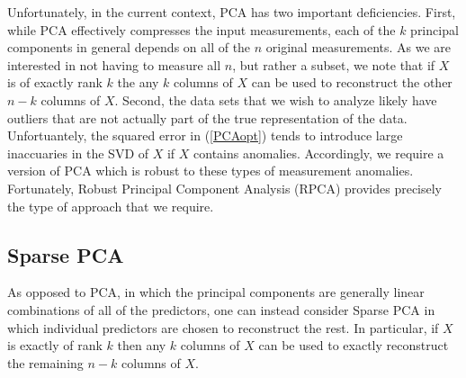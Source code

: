 \documentclass[conference]{IEEEtran}
\begin{document}

Unfortunately, in the current context, PCA has two important deficiencies.  First, while PCA effectively compresses the input measurements, each of the $k$ principal components in general depends on all of the $n$ original measurements.   As we are interested in not having to measure all $n$, but rather a subset, we note that if $X$ is of exactly rank $k$ the any $k$ columns of $X$ can be used to reconstruct the other $n-k$ columns of $X$.
Second, the data sets that we wish to analyze likely have outliers that are not actually part of the true representation of the data.  Unfortuantely, the squared error in (\ref{PCAopt}) tends to introduce large inaccuaries in the SVD of $X$ if $X$ contains anomalies.
Accordingly, we require a version of PCA which is robust to these types of measurement anomalies.   Fortunately, Robust Principal Component Analysis (RPCA) \cite{Candes2009,
 Candes2011, Chandrasekaran2009, Cai2010, Paffenroth2012a,Paffenroth2013b} provides precisely the type of approach that we require.   

\subsection{Sparse PCA}\label{SPCA}

As opposed to PCA, in which the principal components are generally linear combinations of all of the predictors, one can instead consider Sparse PCA \cite{htf01} in which individual predictors are chosen to reconstruct the rest. In particular, if $X$ is exactly of rank $k$ then any $k$ columns of $X$ can be used to exactly reconstruct the remaining $n-k$ columns of $X$.

\end{document}
